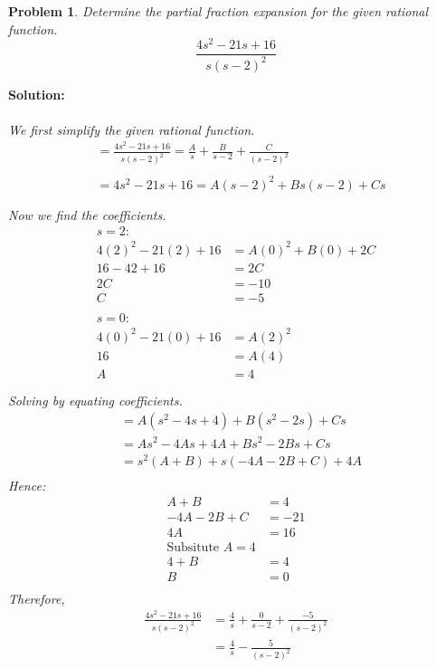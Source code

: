 \documentclass{article}
\newtheorem{problem}{Problem}
\begin{document}
    \begin{problem}
        Determine the partial fraction expansion for the given rational function. 
        \[
            \frac{4s^{2} - 21s + 16}{s(s - 2)^{2}}
        \]
    \end{problem}
    \textbf{Solution:} \\ \\
    \textit{We first simplify the given rational function.} \\
    \begin{align*}
        &= \frac{4s^{2} - 21s + 16}{s(s - 2)^{2}} = \frac{A}{s} + \frac{B}{s - 2} + \frac{C}{(s - 2)^{2}} \\ \\
        &= 4s^{2} - 21s + 16 = A(s - 2)^{2} + Bs(s - 2) + Cs \\ \\
    \end{align*}
    \textit{Now we find the coefficients.} \\
    \begin{align*}
        s = 2: \\
        4(2)^{2} - 21(2) + 16 &= A(0)^{2} + B(0) + 2C \\
        16 - 42 + 16 &= 2C \\
        2C &= -10 \\
        C &= -5 \\ \\
        s = 0: \\
        4(0)^{2} - 21(0) + 16 &= A(2)^{2} \\
        16 &= A(4) \\
        A &= 4 \\ \\
    \end{align*}
    \textit{Solving by equating coefficients.} \\
    \begin{align*}
        &= A(s^{2} - 4s + 4) + B(s^{2} - 2s) + Cs \\
        &= As^{2} - 4As + 4A + Bs^{2} - 2Bs + Cs \\
        &= s^{2}(A + B) +  s(-4A - 2B + C) + 4A \\
    \end{align*}
    \newpage
    \textit{Hence:} \\
    \begin{align*}
        A + B &= 4 \\
        -4A - 2B + C &= -21 \\
        4A &= 16 \\
    \text{Subsitute $A = 4$} \\
        4 + B &= 4 \\
        B &= 0 \\
    \end{align*} 
    \textit{Therefore,} \\
    \begin{align*}
        \frac{4s^{2} -21s + 16}{s(s - 2)^{2}} &= \frac{4}{s} + \frac{0}{s - 2} + \frac{-5}{(s - 2)^{2}} \\
        &= \frac{4}{s} - \frac{5}{(s - 2)^{2}}
    \end{align*}
\end{document}
